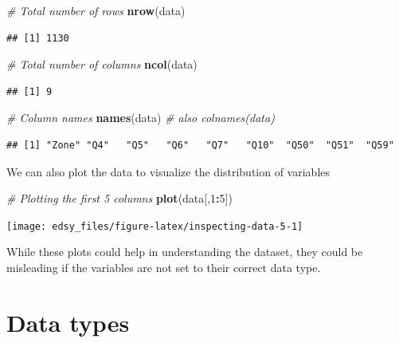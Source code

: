 \documentclass[
]{book}
\newenvironment{Shaded}{\begin{snugshade}}{\end{snugshade}}
\newcommand{\CommentTok}[1]{\textcolor[rgb]{0.56,0.35,0.01}{\textit{#1}}}
\newcommand{\DecValTok}[1]{\textcolor[rgb]{0.00,0.00,0.81}{#1}}
\newcommand{\KeywordTok}[1]{\textcolor[rgb]{0.13,0.29,0.53}{\textbf{#1}}}
\newcommand{\NormalTok}[1]{#1}
\newcommand{\OperatorTok}[1]{\textcolor[rgb]{0.81,0.36,0.00}{\textbf{#1}}}
\begin{document}
\begin{Shaded}
\begin{Highlighting}[]
\CommentTok{\# Total number of rows}
\KeywordTok{nrow}\NormalTok{(data)}
\end{Highlighting}
\end{Shaded}

\begin{verbatim}
## [1] 1130
\end{verbatim}

\begin{Shaded}
\begin{Highlighting}[]
\CommentTok{\# Total number of columns}
\KeywordTok{ncol}\NormalTok{(data)}
\end{Highlighting}
\end{Shaded}

\begin{verbatim}
## [1] 9
\end{verbatim}

\begin{Shaded}
\begin{Highlighting}[]
\CommentTok{\# Column names}
\KeywordTok{names}\NormalTok{(data) }\CommentTok{\# also colnames(data)}
\end{Highlighting}
\end{Shaded}

\begin{verbatim}
## [1] "Zone" "Q4"   "Q5"   "Q6"   "Q7"   "Q10"  "Q50"  "Q51"  "Q59"
\end{verbatim}

We can also plot the data to visualize the distribution of variables

\begin{Shaded}
\begin{Highlighting}[]
\CommentTok{\# Plotting the first 5 columns}
\KeywordTok{plot}\NormalTok{(data[,}\DecValTok{1}\OperatorTok{:}\DecValTok{5}\NormalTok{])}
\end{Highlighting}
\end{Shaded}

\texttt{[image: edsy\_files/figure-latex/inspecting-data-5-1]}

While these plots could help in understanding the dataset, they could be misleading if the variables are not set to their correct data type.

\hypertarget{data-types}{%
\section{Data types}\label{data-types}}
\end{document}
